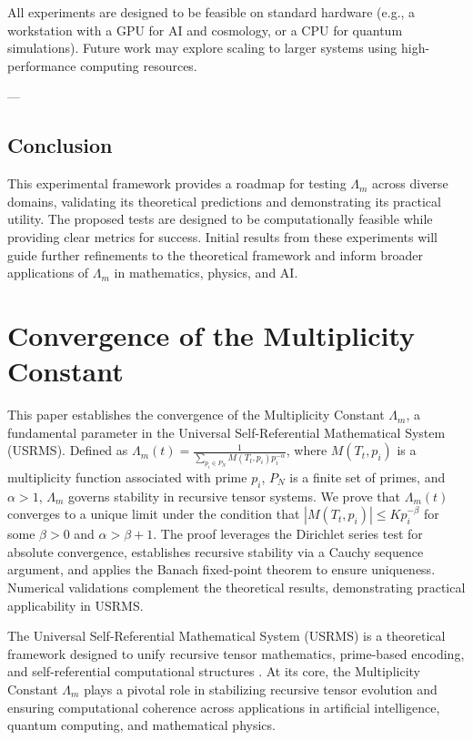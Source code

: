 \documentclass{article}
\theoremstyle{plain}
\begin{document}
All experiments are designed to be feasible on standard hardware (e.g., a workstation with a GPU for AI and cosmology, or a CPU for quantum simulations). Future work may explore scaling to larger systems using high-performance computing resources.

---

\subsection{Conclusion}

This experimental framework provides a roadmap for testing \(\Lambda_m\) across diverse domains, validating its theoretical predictions and demonstrating its practical utility. The proposed tests are designed to be computationally feasible while providing clear metrics for success. Initial results from these experiments will guide further refinements to the theoretical framework and inform broader applications of \(\Lambda_m\) in mathematics, physics, and AI.


\section{Convergence of the Multiplicity Constant}
This paper establishes the convergence of the Multiplicity Constant \( \Lambda_m \), a fundamental parameter in the Universal Self-Referential Mathematical System (USRMS). Defined as \( \Lambda_m(t) = \frac{1}{\sum_{p_i \in P_N} M(T_t, p_i) p_i^{-\alpha}} \), where \( M(T_t, p_i) \) is a multiplicity function associated with prime \( p_i \), \( P_N \) is a finite set of primes, and \( \alpha > 1 \), \( \Lambda_m \) governs stability in recursive tensor systems. We prove that \( \Lambda_m(t) \) converges to a unique limit under the condition that \( |M(T_t, p_i)| \leq K p_i^{-\beta} \) for some \( \beta > 0 \) and \( \alpha > \beta + 1 \). The proof leverages the Dirichlet series test for absolute convergence, establishes recursive stability via a Cauchy sequence argument, and applies the Banach fixed-point theorem to ensure uniqueness. Numerical validations complement the theoretical results, demonstrating practical applicability in USRMS.

The Universal Self-Referential Mathematical System (USRMS) is a theoretical framework designed to unify recursive tensor mathematics, prime-based encoding, and self-referential computational structures \cite{USRMS2023}. At its core, the Multiplicity Constant \( \Lambda_m \) plays a pivotal role in stabilizing recursive tensor evolution and ensuring computational coherence across applications in artificial intelligence, quantum computing, and mathematical physics.
\end{document}
